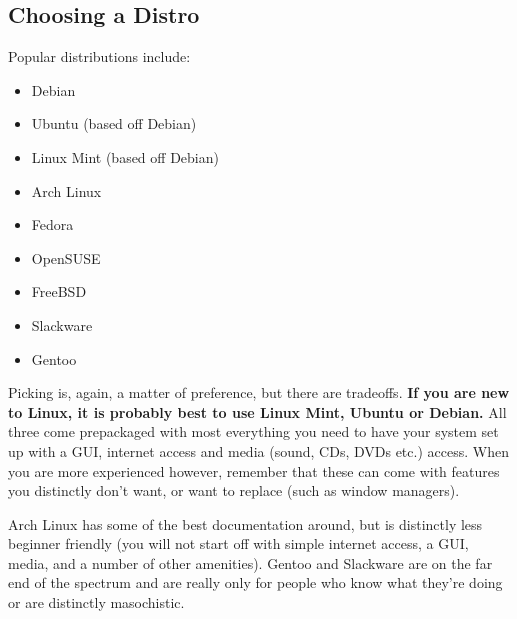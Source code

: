 \documentclass[12pt]{book}
\begin{document}
			\subsection{Choosing a Distro}
				Popular distributions include:
				\begin{itemize}
					\item Debian
					\item Ubuntu (based off Debian)
					\item Linux Mint (based off Debian)
					\item Arch Linux
					\item Fedora
					\item OpenSUSE
					\item FreeBSD
					\item Slackware
					\item Gentoo
				\end{itemize}
				Picking is, again, a matter of preference, but there are tradeoffs.  {\bf If you are new to Linux, it is probably best to use Linux Mint, Ubuntu or Debian.}  All three come prepackaged with most everything you need to have your system set up with a GUI, internet access and media (sound, CDs, DVDs etc.) access.  When you are more experienced however, remember that these can come with features you distinctly don't want, or want to replace (such as window managers).
				
				Arch Linux has some of the best documentation around, but is distinctly less beginner friendly (you will not start off with simple internet access, a GUI, media, and a number of other amenities).  Gentoo and Slackware are on the far end of the spectrum and are really only for people who know what they're doing or are distinctly masochistic.
				
\end{document}
